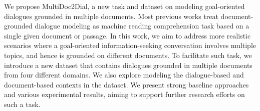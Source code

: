 We propose MultiDoc2Dial, a new task and dataset on modeling goal-oriented dialogues grounded in multiple documents. Most previous works treat document-grounded dialogue modeling as machine reading comprehension task based on a single given document or passage. In this work, we aim to address more realistic scenarios where a goal-oriented information-seeking conversation involves multiple topics, and hence is grounded on different documents. To facilitate such task, we introduce a new dataset that contains dialogues grounded in multiple documents from four different domains. We also explore modeling the dialogue-based and document-based contexts in the dataset. We present strong baseline approaches and various experimental results, aiming to support further research efforts on such a task.
